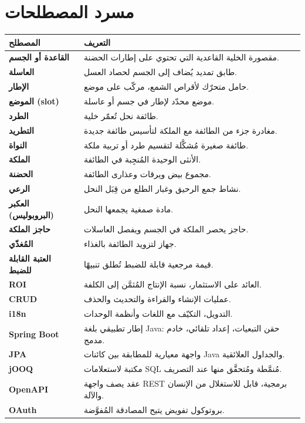 \chapter{مسرد المصطلحات}
\begin{xltabular}{\textwidth}{>{\bfseries}p{4cm} X}
\toprule
\textbf{المصطلح} & \textbf{التعريف} \\
\midrule
\endhead
القاعدة أو الجسم & مقصورة الخلية القاعدية التي تحتوي على إطارات الحضنة. \\
العاسلة & طابق تمديد يُضاف إلى الجسم لحصاد العسل. \\
الإطار & حامل متحرّك لأقراص الشمع، مركّب على موضع. \\
الموضع (slot) & موضع محدّد لإطار في جسم أو عاسلة. \\
الطرد & طائفة نحل تُعمّر خلية. \\
التطريد & مغادرة جزء من الطائفة مع الملكة لتأسيس طائفة جديدة. \\
النواة & طائفة صغيرة مُشكَّلة لتقسيم طرد أو تربية ملكة. \\
الملكة & الأنثى الوحيدة المُنجِبة في الطائفة. \\
الحضنة & مجموع بيض ويرقات وعذارى الطائفة. \\
الرعي & نشاط جمع الرحيق وغبار الطلع من قِبَل النحل. \\
العكبر (البروبوليس) & مادة صمغية يجمعها النحل. \\
حاجز الملكة & حاجز يحصر الملكة في الجسم ويفصل العاسلات. \\
المُغذّي & جهاز لتزويد الطائفة بالغذاء. \\
العتبة القابلة للضبط & قيمة مرجعية قابلة للضبط تُطلق تنبيهًا. \\
ROI & العائد على الاستثمار، نسبة الإنتاج المُثمَّن إلى الكلفة. \\
CRUD & عمليات الإنشاء والقراءة والتحديث والحذف. \\
i18n & التدويل، التكيّف مع اللغات وأنظمة الوحدات. \\
Spring Boot & إطار تطبيقي بلغة Java: حقن التبعيات، إعداد تلقائي، خادم مدمج. \\
JPA & واجهة معيارية للمطابقة بين كائنات Java والجداول العلائقية. \\
jOOQ & مكتبة لاستعلامات SQL مُنمَّطة ومُتحقَّق منها عند التصريف. \\
OpenAPI & عقد يصف واجهة REST برمجية، قابل للاستغلال من الإنسان والآلة. \\
OAuth & بروتوكول تفويض يتيح المصادقة المُفوَّضة. \\

\end{xltabular}
